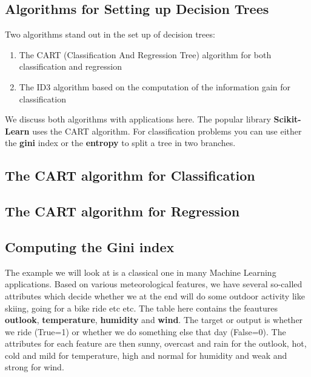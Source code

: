 \documentclass[%
oneside,                 %
final,                   %
10pt]{article}
\begin{document}
\subsection{Algorithms for Setting up Decision Trees}

Two algorithms stand out in the set up of decision trees:
\begin{enumerate}
\item The CART (Classification And Regression Tree) algorithm for both classification and regression

\item The ID3 algorithm based on the computation of the information gain for classification
\end{enumerate}

\noindent
We discuss both algorithms with applications here. The popular library \textbf{Scikit-Learn} uses the CART algorithm. For classification problems you can use either the \textbf{gini} index or the \textbf{entropy} to split a tree in two branches.

\subsection{The CART algorithm for Classification}


\subsection{The CART algorithm for Regression}



\subsection{Computing the Gini index}

The example we will look at is a classical one in many Machine
Learning applications. Based on various meteorological features, we
have several so-called attributes which decide whether we at the end
will do some outdoor activity like skiing, going for a bike ride etc
etc.  The table here contains the feautures \textbf{outlook}, \textbf{temperature},
\textbf{humidity} and \textbf{wind}.  The target or output is whether we ride
(True=1) or whether we do something else that day (False=0). The
attributes for each feature are then sunny, overcast and rain for the
outlook, hot, cold and mild for temperature, high and normal for
humidity and weak and strong for wind.
\end{document}

